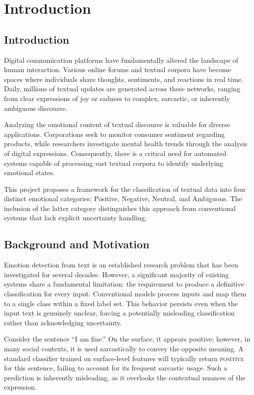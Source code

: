 \chapter{Introduction}

\section{Introduction}

Digital communication platforms have fundamentally altered the landscape of human interaction. Various online forums and textual corpora have become spaces where individuals share thoughts, sentiments, and reactions in real time. Daily, millions of textual updates are generated across these networks, ranging from clear expressions of joy or sadness to complex, sarcastic, or inherently ambiguous discourse.

Analyzing the emotional content of textual discourse is valuable for diverse applications. Corporations seek to monitor consumer sentiment regarding products, while researchers investigate mental health trends through the analysis of digital expressions. Consequently, there is a critical need for automated systems capable of processing vast textual corpora to identify underlying emotional states.

This project proposes a framework for the classification of textual data into four distinct emotional categories: Positive, Negative, Neutral, and Ambiguous. The inclusion of the latter category distinguishes this approach from conventional systems that lack explicit uncertainty handling.

\section{Background and Motivation}

Emotion detection from text is an established research problem that has been investigated for several decades. However, a significant majority of existing systems share a fundamental limitation: the requirement to produce a definitive classification for every input. Conventional models process inputs and map them to a single class within a fixed label set. This behavior persists even when the input text is genuinely unclear, forcing a potentially misleading classification rather than acknowledging uncertainty.

Consider the sentence ``I am fine.'' On the surface, it appears positive; however, in many social contexts, it is used sarcastically to convey the opposite meaning. A standard classifier trained on surface-level features will typically return \textsc{positive} for this sentence, failing to account for its frequent sarcastic usage. Such a prediction is inherently misleading, as it overlooks the contextual nuances of the expression.

